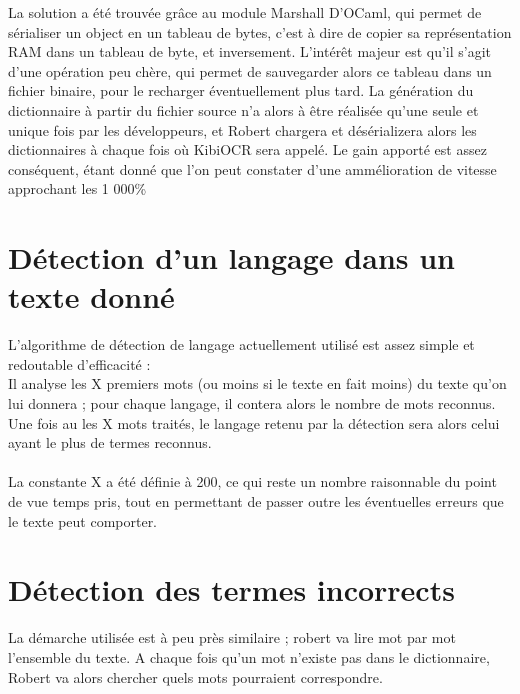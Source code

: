 La solution a été trouvée grâce au module Marshall D'OCaml, qui permet de sérialiser un object en un tableau de bytes,
c'est à dire de copier sa représentation RAM dans un tableau de byte, et inversement. L'intérêt majeur est qu'il s'agit
d'une opération peu chère, qui permet de sauvegarder alors ce tableau dans un fichier binaire, pour le recharger
éventuellement plus tard. La génération du dictionnaire à partir du fichier source n'a alors à être réalisée qu'une
seule et unique fois par les développeurs, et Robert chargera et désérializera alors les dictionnaires à chaque fois
où KibiOCR sera appelé. Le gain apporté est assez conséquent, étant donné que l'on peut constater d'une ammélioration
de vitesse approchant les 1 000\%

\section{Détection d'un langage dans un texte donné}
L'algorithme de détection de langage actuellement utilisé est assez simple et redoutable d'efficacité :\\
Il analyse les X premiers mots (ou moins si le texte en fait moins) du texte qu'on lui donnera ; pour chaque langage, il contera alors le nombre de mots
reconnus. Une fois au les X mots traités, le langage retenu par la détection sera alors celui ayant le plus de termes reconnus.\\
\\
La constante X a été définie à 200, ce qui reste un nombre raisonnable du point de vue temps pris, tout en permettant de passer outre les
éventuelles erreurs que le texte peut comporter.\\
\section{Détection des termes incorrects}
La démarche utilisée est à peu près similaire ; robert va lire mot par mot l'ensemble du texte. A chaque fois qu'un mot n'existe pas dans le dictionnaire,
Robert va alors chercher quels mots pourraient correspondre. 
